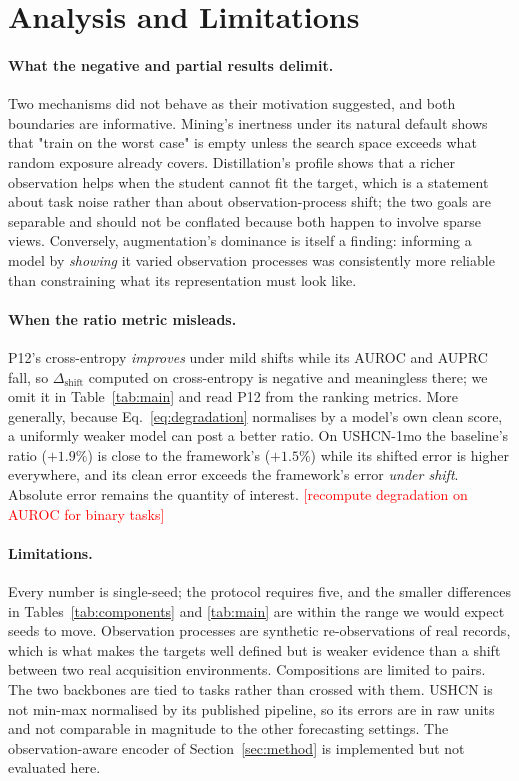 \documentclass[sigconf,nonacm]{acmart}
\newcommand{\todo}[1]{\textcolor{red}{[#1]}}
\begin{document}
\section{Analysis and Limitations}
\label{sec:analysis}

\paragraph{What the negative and partial results delimit.}
Two mechanisms did not behave as their motivation suggested, and both boundaries are informative. Mining's
inertness under its natural default shows that "train on the worst case" is empty unless the search space
exceeds what random exposure already covers. Distillation's profile shows that a richer observation helps when
the student cannot fit the target, which is a statement about task noise rather than about observation-process
shift; the two goals are separable and should not be conflated because both happen to involve sparse views.
Conversely, augmentation's dominance is itself a finding: informing a model by \emph{showing} it varied
observation processes was consistently more reliable than constraining what its representation must look like.

\paragraph{When the ratio metric misleads.}
P12's cross-entropy \emph{improves} under mild shifts while its AUROC and AUPRC fall, so
$\Delta_{\mathrm{shift}}$ computed on cross-entropy is negative and meaningless there; we omit it in
Table~\ref{tab:main} and read P12 from the ranking metrics. More generally, because
Eq.~\ref{eq:degradation} normalises by a model's own clean score, a uniformly weaker model can post a better
ratio. On USHCN-1mo the baseline's ratio ($+1.9\%$) is close to the framework's ($+1.5\%$) while its shifted
error is higher everywhere, and its clean error exceeds the framework's error \emph{under shift}. Absolute
error remains the quantity of interest. \todo{recompute degradation on AUROC for binary tasks}

\paragraph{Limitations.}
Every number is single-seed; the protocol requires five, and the smaller differences in
Tables~\ref{tab:components} and \ref{tab:main} are within the range we would expect seeds to move. Observation
processes are synthetic re-observations of real records, which is what makes the targets well defined but is
weaker evidence than a shift between two real acquisition environments. Compositions are limited to pairs. The
two backbones are tied to tasks rather than crossed with them. USHCN is not min-max normalised by its published
pipeline, so its errors are in raw units and not comparable in magnitude to the other forecasting settings. The
observation-aware encoder of Section~\ref{sec:method} is implemented but not evaluated here.
\end{document}
